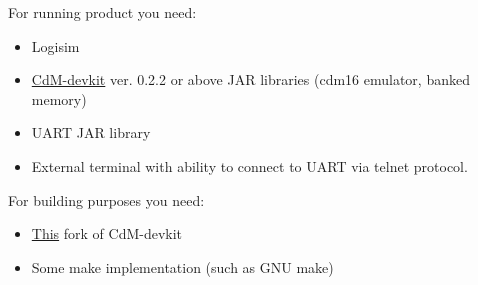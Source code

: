 For running product you need:

\begin{itemize}
	\item Logisim
	\item \href{https://github.com/cdm-processors/cdm-devkit}{CdM-devkit} ver. 0.2.2 or above JAR libraries (cdm16 emulator, banked memory)
	\item UART JAR library
	\item External terminal with ability to connect to UART via telnet protocol.
\end{itemize}

For building purposes you need:

\begin{itemize}
	\item \href{https://github.com/Proletcultist/cdm-devkit-macro-improvements}{This} fork of CdM-devkit
	\item Some make implementation (such as GNU make)
\end{itemize}
